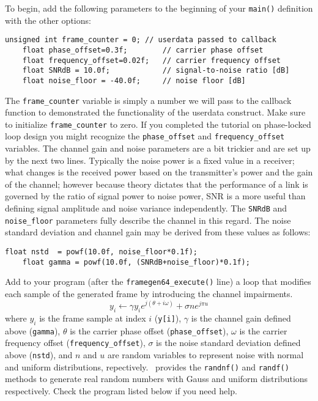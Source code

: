 To begin, add the following parameters to the beginning of your
{\tt main()} definition with the other options:
%
\begin{Verbatim}[fontsize=\small]
    unsigned int frame_counter = 0; // userdata passed to callback
    float phase_offset=0.3f;        // carrier phase offset
    float frequency_offset=0.02f;   // carrier frequency offset
    float SNRdB = 10.0f;            // signal-to-noise ratio [dB]
    float noise_floor = -40.0f;     // noise floor [dB]
\end{Verbatim}
%
The {\tt frame\_counter} variable is simply a number we will pass to the
callback function to demonstrated the functionality of the userdata
construct.
Make sure to initialize {\tt frame\_counter} to zero.
%
If you completed the tutorial on phase-locked loop design you might
recognize the {\tt phase\_offset} and {\tt frequency\_offset} variables.
%
The channel gain and noise parameters are a bit trickier and are set up
by the next two lines.
Typically the noise power is a fixed value in a receiver;
what changes is the received power based on the transmitter's power and
the gain of the channel;
however because theory dictates that the performance of a link is
governed by the ratio of signal power to noise power,
SNR is a more useful than defining signal amplitude and noise variance
independently.
The {\tt SNRdB} and {\tt noise\_floor} parameters fully describe the
channel in this regard.
The noise standard deviation and channel gain may be derived from these
values as follows:
%
\begin{Verbatim}[fontsize=\small]
    float nstd  = powf(10.0f, noise_floor*0.1f);
    float gamma = powf(10.0f, (SNRdB+noise_floor)*0.1f);
\end{Verbatim}
%
Add to your program
(after the {\tt framegen64\_execute()} line)
a loop that modifies each sample of the generated frame by introducing
the channel impairments.
%
\[
    y_i \leftarrow \gamma y_i e^{j(\theta + i\omega)} + \sigma n e^{j \pi u}
\]
%
where
$y_i$ is the frame sample at index $i$ ({\tt y[i]}),
$\gamma$ is the channel gain defined above ({\tt gamma}),
$\theta$ is the carrier phase offset ({\tt phase\_offset}),
$\omega$ is the carrier frequency offset ({\tt frequency\_offset}),
$\sigma$ is the noise standard deviation defined above ({\tt nstd}), and
$n$ and $u$ are random variables to represent noise with
normal and uniform distributions, repectively.
\liquid\ provides the {\tt randnf()} and {\tt randf()} methods to
generate real random numbers with Gauss and uniform distributions
respectively.
Check the program listed below if you need help.

